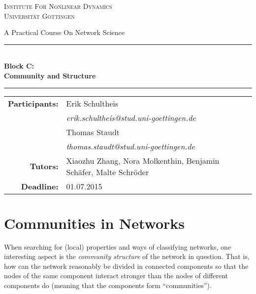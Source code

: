 \documentclass{scrartcl}
\begin{document}
\begin{titlepage}\centering
\textsc{\Large Institute For Nonlinear Dynamics \\[1.5ex] Universität Göttingen}

\vspace*{2cm}
{\huge A Practical Course On Network Science}
\vspace*{2cm}

\rule{\textwidth}{1pt}\\[0.5cm]
{\bfseries \huge Block C: \\[0.5cm] \huge \bfseries Community and Structure\\[0.5cm]}
\rule{\textwidth}{1pt}

\vspace*{4cm}

\begin{Large}\begin{tabular}{rl}
        \textbf{Participants:}  & Erik Schultheis                                \\    
                   & \textit{erik.schultheis@stud.uni-goettingen.de}\\[0.5cm]
                   & Thomas Staudt                                  \\
                   & \textit{thomas.staudt@stud.uni-goettingen.de}  \\[1.0cm]

       \textbf{Tutors:}        & Xiaozhu Zhang, Nora Molkenthin, Benjamin Schäfer, Malte Schröder  \\[1.0cm]
       \textbf{Deadline:}      & 01.07.2015
\end{tabular}\end{Large}

\vspace*{1.5cm}


\end{titlepage}

\tableofcontents
\clearpage
\section{Communities in Networks}
When searching for (local) properties and ways of classifying networks, one
interesting aspect is the \emph{community structure} of the network in
question. That is, how can the network reasonably be divided in connected
components so that the nodes of the same component interact stronger than
the nodes of different components do (meaning that the components form
\enquote{communities}).
\end{document}

